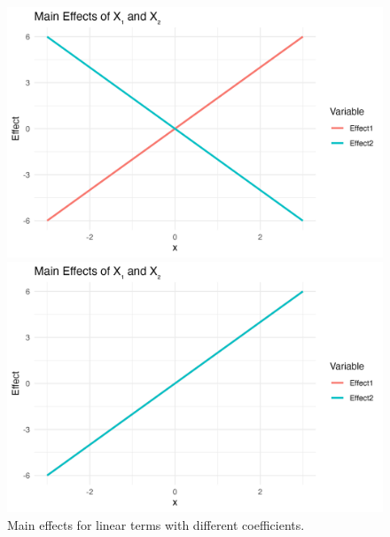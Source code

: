 \begin{figure}[htpb]
\begin{minipage}[t]{0.49\textwidth}
    \end{minipage}
    \hfill
    \begin{minipage}[t]{0.49\textwidth}
        \centering
        \includegraphics[width=\textwidth]{images/linear_a1p20_a2m20_a11p00_a22p00_a12p00_rhop00_main.png}
    \end{minipage}
    \hfill
    \begin{minipage}[t]{0.49\textwidth}
        \centering
        \includegraphics[width=\textwidth]{images/linear_a1p20_a2p20_a11p00_a22p00_a12p00_rhop00_main.png}
    \end{minipage}
    \caption{Main effects for linear terms with different coefficients.}
    \label{fig:linear_main_effects}
\end{figure}


